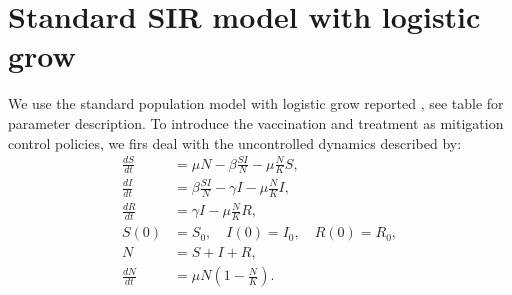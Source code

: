 \section{Standard SIR model with logistic grow}
We use the standard population model with logistic grow reported
\cite{Schaefer2009}, see table for parameter description. To introduce the 
vaccination and treatment as mitigation control policies, we firs deal with the
uncontrolled dynamics described by:
\begin{equation}\label{eqn:SIR}
	\begin{aligned}
		\frac{dS}{dt} &=
			\mu N  
			- \beta \frac{S I}{N} 
			- \mu \frac{N}{K} S ,
		\\
		\frac{dI}{dt} &=
			\beta \frac{S I}{N}
			- \gamma I
			- \mu \frac{N}{K} I,
		\\
		\frac{dR}{dt} &= 
			\gamma I 
			- \mu \frac{N}{K} R ,
		\\
		S(0) &= S_0, \quad
		I(0) = I_0, \quad
		R(0) = R_0,
		\\
		N &= S + I +R,
		\\
		\frac{dN}{dt} &=
			\mu N 
			\left(
				1 - \frac{N}{K}
			\right).
	\end{aligned}
\end{equation}

